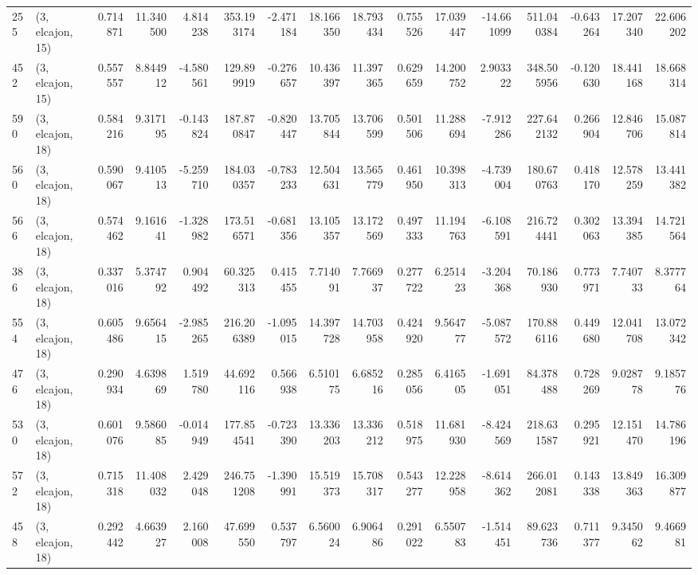 \begin{tabular}{llrrrrrrrrrrrrrr}
255 &  (3, elcajon, 15) &   0.714871 &  11.340500 &   4.814238 &   353.193174 &  -2.471184 &  18.166350 &  18.793434 &  0.755526 &  17.039447 & -14.661099 &    511.040384 &  -0.643264 &   17.207340 &   22.606202 \\
452 &  (3, elcajon, 15) &   0.557557 &   8.844912 &  -4.580561 &   129.899919 &  -0.276657 &  10.436397 &  11.397365 &  0.629659 &  14.200752 &   2.903322 &    348.505956 &  -0.120630 &   18.441168 &   18.668314 \\
590 &  (3, elcajon, 18) &   0.584216 &   9.317195 &  -0.143824 &   187.870847 &  -0.820447 &  13.705844 &  13.706599 &  0.501506 &  11.288694 &  -7.912286 &    227.642132 &   0.266904 &   12.846706 &   15.087814 \\
560 &  (3, elcajon, 18) &   0.590067 &   9.410513 &  -5.259710 &   184.030357 &  -0.783233 &  12.504631 &  13.565779 &  0.461950 &  10.398313 &  -4.739004 &    180.670763 &   0.418170 &   12.578259 &   13.441382 \\
566 &  (3, elcajon, 18) &   0.574462 &   9.161641 &  -1.328982 &   173.516571 &  -0.681356 &  13.105357 &  13.172569 &  0.497333 &  11.194763 &  -6.108591 &    216.724441 &   0.302063 &   13.394385 &   14.721564 \\
386 &  (3, elcajon, 18) &   0.337016 &   5.374792 &   0.904492 &    60.325313 &   0.415455 &   7.714091 &   7.766937 &  0.277722 &   6.251423 &  -3.204368 &     70.186930 &   0.773971 &    7.740733 &    8.377764 \\
554 &  (3, elcajon, 18) &   0.605486 &   9.656415 &  -2.985265 &   216.206389 &  -1.095015 &  14.397728 &  14.703958 &  0.424920 &   9.564777 &  -5.087572 &    170.886116 &   0.449680 &   12.041708 &   13.072342 \\
476 &  (3, elcajon, 18) &   0.290934 &   4.639869 &   1.519780 &    44.692116 &   0.566938 &   6.510175 &   6.685216 &  0.285056 &   6.416505 &  -1.691051 &     84.378488 &   0.728269 &    9.028778 &    9.185776 \\
530 &  (3, elcajon, 18) &   0.601076 &   9.586085 &  -0.014949 &   177.854541 &  -0.723390 &  13.336203 &  13.336212 &  0.518975 &  11.681930 &  -8.424569 &    218.631587 &   0.295921 &   12.151470 &   14.786196 \\
572 &  (3, elcajon, 18) &   0.715318 &  11.408032 &   2.429048 &   246.751208 &  -1.390991 &  15.519373 &  15.708317 &  0.543277 &  12.228958 &  -8.614362 &    266.012081 &   0.143338 &   13.849363 &   16.309877 \\
458 &  (3, elcajon, 18) &   0.292442 &   4.663927 &   2.160008 &    47.699550 &   0.537797 &   6.560024 &   6.906486 &  0.291022 &   6.550783 &  -1.514451 &     89.623736 &   0.711377 &    9.345062 &    9.466981 \\

\end{tabular}
